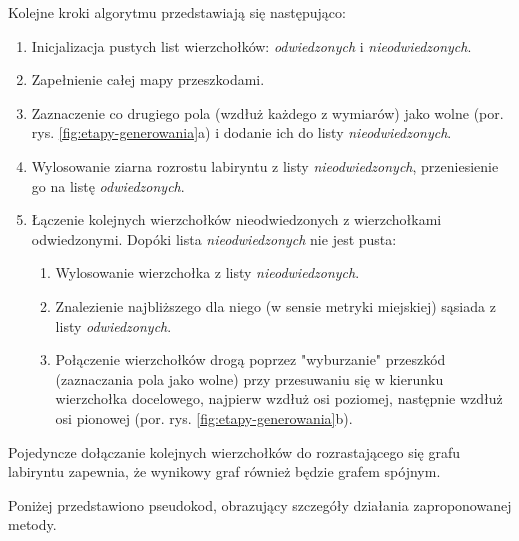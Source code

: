 Kolejne kroki algorytmu przedstawiają się następująco:
\begin{enumerate}
	\item Inicjalizacja pustych list wierzchołków: {\it odwiedzonych} i {\it nieodwiedzonych}.
	\item Zapełnienie całej mapy przeszkodami.
	\item Zaznaczenie co drugiego pola (wzdłuż każdego z wymiarów) jako wolne (por. rys. \ref{fig:etapy-generowania}a) i dodanie ich do listy {\it nieodwiedzonych}.
	\item Wylosowanie ziarna rozrostu labiryntu z listy {\it nieodwiedzonych}, przeniesienie go na listę {\it odwiedzonych}.
	\item Łączenie kolejnych wierzchołków nieodwiedzonych z wierzchołkami odwiedzonymi. Dopóki lista {\it nieodwiedzonych} nie jest pusta:
	\begin{enumerate}
		\item Wylosowanie wierzchołka z listy {\it nieodwiedzonych}.
		\item Znalezienie najbliższego dla niego (w sensie metryki miejskiej) sąsiada z listy {\it odwiedzonych}.
		\item Połączenie wierzchołków drogą poprzez "wyburzanie" przeszkód (zaznaczania pola jako wolne) przy przesuwaniu się w kierunku wierzchołka docelowego, najpierw wzdłuż osi poziomej, następnie wzdłuż osi pionowej (por. rys. \ref{fig:etapy-generowania}b).
	\end{enumerate}
\end{enumerate}

Pojedyncze dołączanie kolejnych wierzchołków do rozrastającego się grafu labiryntu zapewnia, że wynikowy graf również będzie grafem spójnym.

Poniżej przedstawiono pseudokod, obrazujący szczegóły działania zaproponowanej metody.

